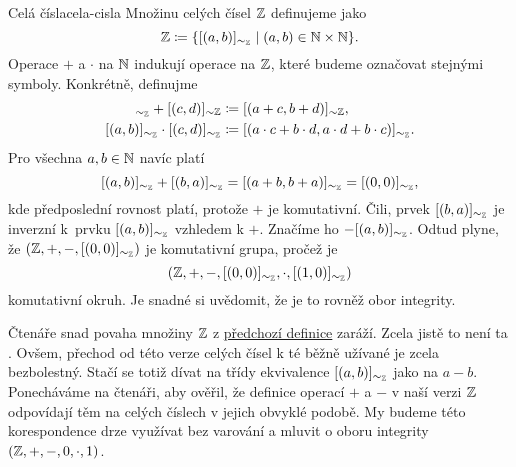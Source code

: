 \begin{definition}{Celá čísla}{cela-cisla}
 Množinu celých čísel $\mathbb{Z}$ definujeme jako
 \[
  \mathbb{Z} \coloneqq \{[(a,b)]_{ \sim _{\mathbb{Z}}} \mid (a,b) \in \mathbb{N} \times \mathbb{N}\}.
 \]
 Operace $+$ a $ \cdot $ na $\mathbb{N}$ indukují operace na $\mathbb{Z}$, které budeme
 označovat stejnými symboly. Konkrétně, definujme
 \begin{align*}
  [(a,b)]_{ \sim _{\Z}} + [(c,d)]_{ \sim \Z} &\coloneqq [(a+c,b+d)]_{ \sim
  \Z},\\
   [(a,b)]_{ \sim _{\Z}} \cdot [(c,d)]_{ \sim _{\Z}} & \coloneqq [(a \cdot c +
   b \cdot d,a \cdot d + b \cdot c)]_{ \sim _{\Z}}.
 \end{align*}
 Pro všechna $a,b \in \mathbb{N}$ navíc platí
 \[
  [(a,b)]_{ \sim _{\mathbb{Z}}} + [(b,a)]_{ \sim _{\mathbb{Z}}} = [(a+b,b+a)]_{ \sim _{\mathbb{Z}}} =
  [(0,0)]_{ \sim _{\mathbb{Z}}},
 \]
 kde předposlední rovnost platí, protože $+$ je komutativní. Čili, prvek
 $[(b,a)]_{ \sim _{\mathbb{Z}}}$ je inverzní k~prvku $[(a,b)]_{ \sim _{\mathbb{Z}}}$ vzhledem k
 $+$. Značíme ho $-[(a,b)]_{ \sim _{\mathbb{Z}}}$. Odtud plyne, že $(\mathbb{Z},+,-,[(0,0)]_{
 \sim _{\mathbb{Z}}})$ je komutativní grupa, pročež je
 \[
  (\mathbb{Z},+,-,[(0,0)]_{ \sim _{\mathbb{Z}}}, \cdot ,[(1,0)]_{ \sim_{\mathbb{Z}}})
 \]
 komutativní okruh. Je snadné si uvědomit, že je to rovněž obor integrity.
\end{definition}

Čtenáře snad povaha množiny $\mathbb{Z}$ z \hyperref[def:cela-cisla]{předchozí definice}
zaráží. Zcela jistě to není ta . Ovšem, přechod od této verze celých
čísel k té běžně užívané je zcela bezbolestný. Stačí se totiž dívat na třídy
ekvivalence $[(a,b)]_{ \sim _{\mathbb{Z}}}$ jako na  $a-b$. Ponecháváme na
čtenáři, aby ověřil, že definice operací $+$ a $-$ v naší verzi $\mathbb{Z}$ odpovídají
těm na celých číslech v jejich obvyklé podobě. My budeme této korespondence drze
využívat bez varování a mluvit o oboru integrity $(\mathbb{Z},+,-,0, \cdot ,1)$.

